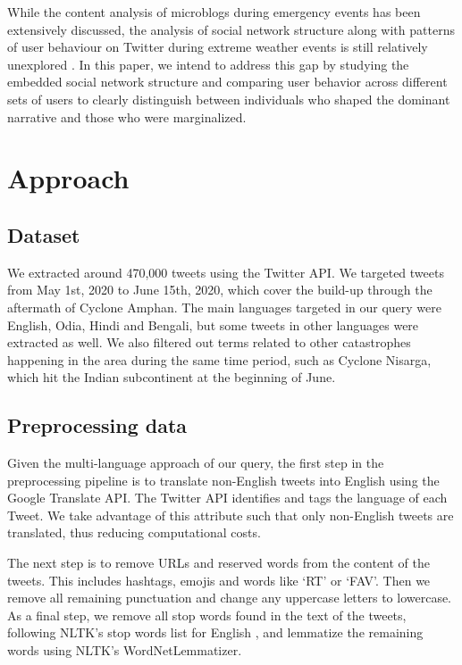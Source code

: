 \documentclass{article}
\begin{document}
While the content analysis of microblogs during emergency events has been extensively discussed, the
analysis of social network structure along with patterns of user behaviour on Twitter during extreme
weather events is still relatively unexplored \cite{Pourebrahim2019}. In this paper, we intend to
address this gap by studying the embedded social network structure and comparing user behavior
across different sets of users to clearly distinguish between individuals who shaped the dominant
narrative and those who were marginalized.

\section{Approach}
\subsection{Dataset}

We extracted around 470,000 tweets using the Twitter API. We targeted tweets from May 1st, 2020 to
June 15th, 2020, which cover the build-up through the aftermath of Cyclone Amphan. The main
languages targeted in our query were English, Odia, Hindi and Bengali, but some tweets in other
languages were extracted as well. We also filtered out terms related to other catastrophes happening
in the area during the same time period, such as Cyclone Nisarga, which hit the Indian subcontinent
at the beginning of June.

\subsection{Preprocessing data}

Given the multi-language approach of our query, the first step in the preprocessing pipeline is to
translate non-English tweets into English using the Google Translate API. The Twitter API identifies
and tags the language of each Tweet. We take advantage of this attribute such that only non-English
tweets are translated, thus reducing computational costs.

The next step is to remove URLs and reserved words from the content of the tweets. This includes
hashtags, emojis and words like \enquote*{RT} or \enquote*{FAV}. Then we remove all remaining
punctuation and change any uppercase letters to lowercase. As a final step, we remove all stop words
found in the text of the tweets, following NLTK's stop words list for English
\cite{Loper02nltk:the}, and lemmatize the remaining words using NLTK's WordNetLemmatizer.
\end{document}
